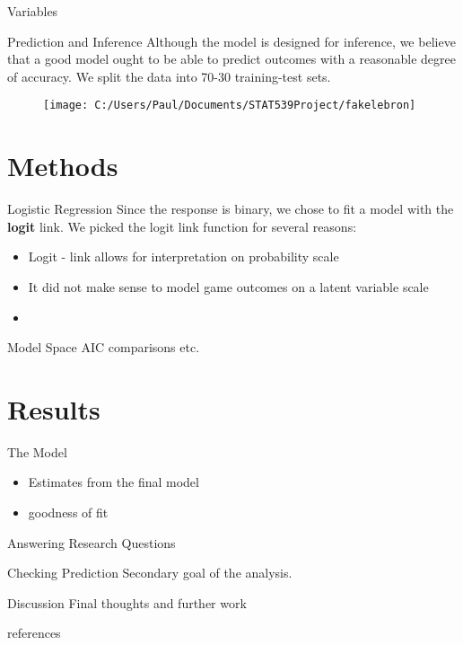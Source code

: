 \documentclass{beamer}
\begin{document}
\begin{frame}{Variables}



\end{frame}

\begin{frame}{Prediction and Inference} 
Although the model is designed for inference, we believe that a good model ought to be able to predict outcomes with a reasonable degree of accuracy. We split the data into 70-30 training-test sets. 
\begin{figure}[r]
	\texttt{[image: C:/Users/Paul/Documents/STAT539Project/fakelebron]}
\end{figure}
\end{frame}

	
	\section{Methods}
	
	\begin{frame}{Logistic Regression}
	Since the response is binary, we chose to fit a model with the \textbf{logit} link. We picked the logit link function for several reasons: 
	\begin{itemize}
		\item Logit - link allows for interpretation on probability scale
		\item It did not make sense to model game outcomes on a latent variable scale
		\item 		
	\end{itemize}
	\end{frame}
	

	
	
\begin{frame}{Model Space}
AIC comparisons etc. 
\end{frame}
	
	
\section{Results}

	\begin{frame}{The Model}
\begin{itemize}
	\item Estimates from the final model 
	\item goodness of fit
\end{itemize}	
\end{frame}	

	
	
\begin{frame}{Answering Research Questions}

\end{frame}	

\begin{frame}{Checking Prediction}
Secondary goal of the analysis. 
\end{frame}

\begin{frame}{Discussion}
Final thoughts and further work

\end{frame}

\begin{frame}
references
\end{frame}
	
	
\end{document}
